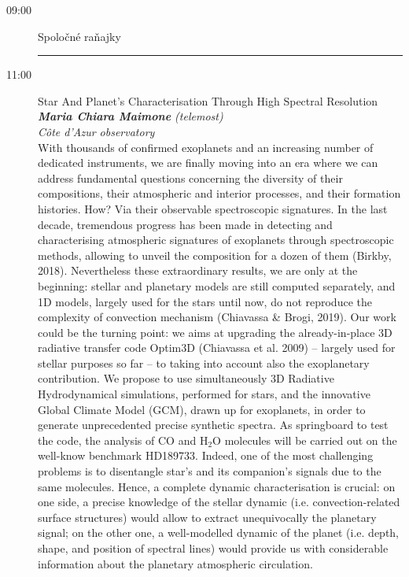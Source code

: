 \documentclass[a4paper]{report}
\begin{document}
        \begin{description}
                            \item[09:00]
                    {\Large Spoločné raňajky} \\[1ex]
                                                                                \rule{\paperwidth}{0.4pt}
                            \item[11:00]
                    {\Large Star And Planet’s Characterisation Through High Spectral Resolution} \\[1ex]
                                            \textit{\textbf{Maria Chiara Maimone} (telemost)} \\%
                                        \textit{Côte d’Azur observatory} \\[1ex]                    With thousands of confirmed exoplanets and an increasing number of dedicated instruments, we are finally moving into an era where we can address fundamental questions concerning the diversity of their compositions, their atmospheric and interior processes, and their formation histories. How? Via their observable spectroscopic signatures. In the last decade, tremendous progress has been made in detecting and characterising atmospheric signatures of exoplanets through spectroscopic methods, allowing to unveil the composition for a dozen of them (Birkby, 2018).
Nevertheless these extraordinary results, we are only at the beginning: stellar and planetary models are still computed separately, and 1D models, largely used for the stars until now, do not reproduce the complexity of convection mechanism (Chiavassa \& Brogi, 2019). Our work could be the turning point: we aims at upgrading the already-in-place 3D radiative transfer code Optim3D (Chiavassa et al. 2009) -- largely used for stellar purposes so far -- to taking into account also the exoplanetary contribution. We propose to use simultaneously 3D Radiative Hydrodynamical simulations, performed for stars, and the innovative Global Climate Model (GCM), drawn up for exoplanets, in order to generate unprecedented precise synthetic spectra. As springboard to test the code, the analysis of CO and $\mathrm{H}_2\mathrm{O}$ molecules will be carried out on the well-know benchmark HD189733. Indeed, one of the most challenging problems is to disentangle star’s and its companion’s signals due to the same molecules. Hence, a complete dynamic characterisation is crucial: on one side, a precise knowledge of the stellar dynamic (i.e. convection-related surface structures) would allow to extract unequivocally the planetary signal; on the other one, a well-modelled dynamic of the planet (i.e. depth, shape, and position of spectral lines) would provide us with considerable information about the planetary atmospheric circulation.
 \\                    
                    \end{description}
\end{document}
